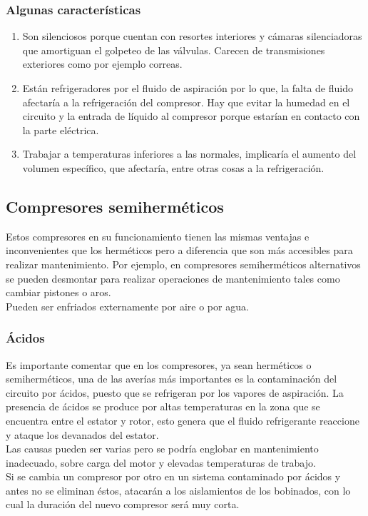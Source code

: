 \subsubsection{Algunas caracter\'isticas}
\begin{enumerate}[1.]
	\item Son silenciosos porque cuentan con resortes interiores y c\'amaras silenciadoras que amortiguan el golpeteo de las v\'alvulas. Carecen de transmisiones exteriores como por ejemplo correas.
	\item Est\'an refrigeradores por el fluido de aspiraci\'on por lo que, la falta de fluido afectar\'ia a la refrigeraci\'on del compresor. Hay que evitar la humedad en el circuito y la entrada de l\'iquido al compresor porque estar\'ian en contacto con la parte el\'ectrica.
	\item Trabajar a temperaturas inferiores a las normales, implicar\'ia el aumento del volumen espec\'ifico, que afectar\'ia, entre otras cosas a la refrigeraci\'on.
\end{enumerate}
\subsection{Compresores semiherméticos}
Estos compresores en su funcionamiento tienen las mismas ventajas e inconvenientes que los herm\'eticos pero a diferencia que son m\'as accesibles para realizar mantenimiento. Por ejemplo, en compresores semiherm\'eticos alternativos se pueden desmontar para realizar operaciones de mantenimiento tales como cambiar pistones o aros.\\ Pueden ser enfriados externamente por aire o por agua.
\subsubsection{\'Acidos}
Es importante comentar que en los compresores, ya sean herm\'eticos o semiherm\'eticos, una de las aver\'ias m\'as importantes es la contaminaci\'on del circuito por \'acidos, puesto que se refrigeran por los vapores de aspiraci\'on. La presencia de \'acidos se produce por altas temperaturas en la zona que se encuentra entre el estator y rotor, esto genera que el fluido refrigerante reaccione y ataque los devanados del estator.\\ Las causas pueden ser varias pero se podr\'ia englobar en mantenimiento inadecuado, sobre carga del motor y elevadas temperaturas de trabajo.\\ Si se cambia un compresor por otro en un sistema contaminado por \'acidos y antes no se eliminan \'estos, atacar\'an a los aislamientos de los bobinados, con lo cual la duraci\'on del nuevo compresor ser\'a muy corta.
